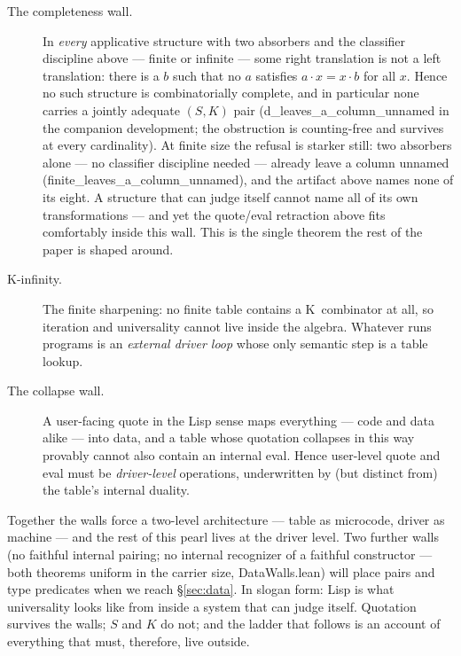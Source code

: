\documentclass[acmsmall,screen,review]{acmart}
\begin{document}
\begin{description}
\item[The completeness wall.] In \emph{every} applicative structure
  with two absorbers and the classifier discipline above --- finite
  or infinite --- some right translation is not a left translation:
  there is a $b$ such that no $a$ satisfies $a \cdot x = x \cdot b$
  for all $x$. Hence no such structure is combinatorially complete,
  and in particular none carries a jointly adequate $(S,K)$ pair
  (\textsf{d\_leaves\_a\_column\_unnamed} in the companion
  development; the obstruction is counting-free and survives at every
  cardinality). At finite size the refusal is starker still: two
  absorbers alone --- no classifier discipline needed --- already
  leave a column unnamed
  (\textsf{finite\_leaves\_a\_column\_unnamed}), and the artifact
  above names none of its eight. A structure that can judge itself
  cannot name all of its own transformations --- and yet the
  quote/eval retraction above fits comfortably inside this wall. This
  is the single theorem the rest of the paper is shaped around.
\item[K-infinity.] The finite sharpening: no finite table contains a
  K~combinator at all, so iteration and universality cannot live
  inside the algebra. Whatever runs programs is an \emph{external
  driver loop} whose only semantic step is a table lookup.
\item[The collapse wall.] A user-facing \textsf{quote} in the Lisp
  sense maps everything --- code and data alike --- into data, and a
  table whose quotation collapses in this way provably cannot also
  contain an internal eval. Hence user-level \textsf{quote} and
  \textsf{eval} must be \emph{driver-level} operations, underwritten
  by (but distinct from) the table's internal duality.
\end{description}

Together the walls force a two-level architecture --- table as
microcode, driver as machine --- and the rest of this pearl lives at
the driver level. Two further walls (no faithful internal pairing; no
internal recognizer of a faithful constructor --- both theorems
uniform in the carrier size, \textsf{DataWalls.lean}) will place
pairs and type predicates when we reach \S\ref{sec:data}. In slogan form: Lisp
is what universality looks like from inside a system that can judge
itself. Quotation survives the walls; $S$ and $K$ do not; and the
ladder that follows is an account of everything that must, therefore,
live outside.
\end{document}

